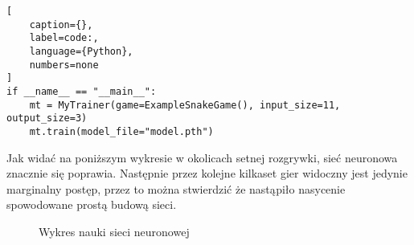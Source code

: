 \begin{onepage}
    \begin{lstlisting}[
    caption={},
    label=code:,
    language={Python},
    numbers=none
]
if __name__ == "__main__":
    mt = MyTrainer(game=ExampleSnakeGame(), input_size=11, output_size=3)
    mt.train(model_file="model.pth")

\end{lstlisting}
\end{onepage}

Jak widać na poniższym wykresie w okolicach setnej rozgrywki, sieć neuronowa znacznie się poprawia. Następnie przez kolejne kilkaset gier widoczny jest jedynie marginalny postęp, przez to można stwierdzić że nastąpiło nasycenie spowodowane prostą budową sieci.

\begin{figure}[h]
    \centering
    \caption{Wykres nauki sieci neuronowej}
    \label{img:ai_graph}
\end{figure}
